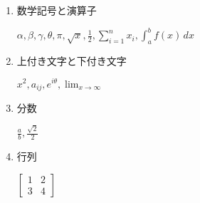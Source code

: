 \begin{enumerate}
	\item 数学記号と演算子
	
	$\alpha, \beta, \gamma, \theta, \pi, \sqrt{x}, \frac{1}{2}, \sum_{i=1}^{n} x_i, \int_{a}^{b} f(x) \, dx$

	\item 上付き文字と下付き文字

	$x^2, a_{ij}, e^{i\theta}, \lim_{x \to \infty}$

	\item 分数
	
	$\frac{a}{b}, \frac{\sqrt{2}}{2}$

	\item 行列
	
	$\begin{bmatrix}
		1 & 2 \\
		3 & 4
	\end{bmatrix}$

\end{enumerate}